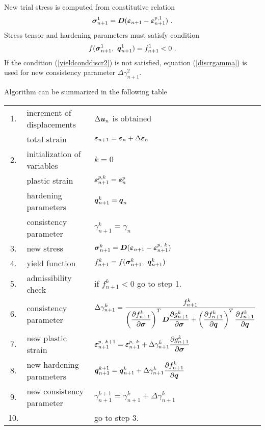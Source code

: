New trial stress is computed from constitutive relation
\begin{equation}
\mbox{\boldmath$\sigma$}_{n+1}^{1} = \mbox{\boldmath$D$} (\mbox{\boldmath$\varepsilon$}_{n+1} - \mbox{\boldmath$\varepsilon$}_{n+1}^{p, 1})\ .
\end{equation}
Stress tensor and hardening parameters must satisfy condition
\begin{equation}\label{yieldconddiscr2}
f(\mbf{\sigma}_{n+1}^{1},\ \mbf{q}_{n+1}^{1}) = f_{n+1}^{1} < 0\ .
\end{equation}
If the condition (\ref{yieldconddiscr2}) is not satisfied, equation (\ref{discrgamma}) is used for new
consistency parameter $\Delta \gamma_{n+1}^{2}$.

Algorithm can be summarized in the following table

\begin{center}
\begin{tabular}{|cl|l|}
\hline
1. & increment of displacements & $\Delta \mbox{\boldmath$u$}_{n}$ is obtained
\\[4mm]
 & total strain & $\mbox{\boldmath$\varepsilon$}_{n+1} = \mbox{\boldmath$\varepsilon$}_{n} + \Delta \mbox{\boldmath$\varepsilon$}_{n}$
\\[4mm]
2. &
initialization of variables & $k=0$
\\[4mm]
 & plastic strain & $\mbox{\boldmath$\varepsilon$}_{n+1}^{p,k} = \mbox{\boldmath$\varepsilon$}_{n}^{p}$
\\[4mm]
 & hardening parameters & $\mbox{\boldmath$q$}_{n+1}^{k} = \mbox{\boldmath$q$}_{n}$
\\[4mm]
 & consistency parameter & $\gamma_{n+1}^{k} = \gamma_{n}$
\\[4mm] \hline
3. & new stress & $\mbox{\boldmath$\sigma$}_{n+1}^{k} = \mbox{\boldmath$D$} (\mbox{\boldmath$\varepsilon$}_{n+1} - \mbox{\boldmath$\varepsilon$}_{n+1}^{p,\ k})$
\\[4mm]
4. & yield function & $f_{n+1}^{k} = f(\mbox{\boldmath$\sigma$}_{n+1}^{k},\ \mbox{\boldmath$q$}_{n+1}^{k})$
\\[4mm]
5. & admissibility check & if $f_{n+1}^{k}<0$ go to step 1.
\\[4mm]
6. & consistency parameter & $\Delta \gamma_{n+1}^{k} = \mbox{$\displaystyle\frac{f_{n+1}^{k}}{\left(\mbox{$\displaystyle\frac{\partial{f_{n+1}^{k}}}{\partial{\mbox{\boldmath$\sigma$}}}$}\right)^T \mbox{\boldmath$D$} \mbox{$\displaystyle\frac{\partial{g_{n+1}^{k}}}{\partial{\mbox{\boldmath$\sigma$}}}$} +
\left(\mbox{$\displaystyle\frac{\partial{f_{n+1}^{k}}}{\partial{\mbox{\boldmath$q$}}}$}\right)^T \mbox{$\displaystyle\frac{\partial{f_{n+1}^{k}}}{\partial{\mbox{\boldmath$q$}}}$}}$}
$
\\[13mm]
7. & new plastic strain &
$\mbox{\boldmath$\varepsilon$}^{p,\ k+1}_{n+1} = \mbox{\boldmath$\varepsilon$}^{p,\ k}_{n+1} + \Delta \gamma_{n+1}^{k} \mbox{$\displaystyle\frac{\partial{g_{n+1}^{k}}}{\partial{\mbox{\boldmath$\sigma$}}}$}$
\\[4mm]
8. & new hardening parameters &
$\mbox{\boldmath$q$}_{n+1}^{k+1} = \mbox{\boldmath$q$}_{n+1}^{k} + \Delta \gamma_{n+1}^{k} \mbox{$\displaystyle\frac{\partial{f_{n+1}^{k}}}{\partial{\mbox{\boldmath$q$}}}$}$
\\[4mm]
9. & new consistency parameter & $\gamma_{n+1}^{k+1} = \gamma_{n+1}^{k} + \Delta \gamma_{n+1}^{k}$
\\[4mm]
10. & & go to step 3.
\\ \hline
\end{tabular}
\end{center}
